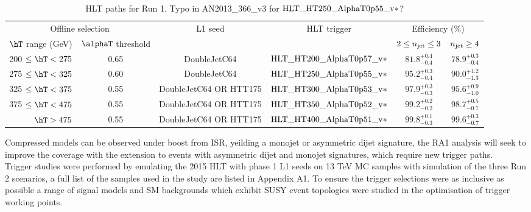 \begin{table}[h!]
\tiny
\centering
\begin{tabular}{|rc||c|c||cc|} 
\hline
\multicolumn{2}{|c||}{Offline selection}         & L1 seed                  & HLT trigger                                               &   \multicolumn{2}{c|}{Efficiency (\%)}            \\[0.7 ex] 
    $\hT$ range (GeV)  & $\alphaT$ threshold &                               &                                                                  &  $2 \le n_{\rm jet} \le 3$ &   $n_{\rm jet} \ge 4$\\[0.7 ex] 
\hline
200 $\le \hT < 275$    & 0.65                         & DoubleJetC64                    &  ${\rm HLT\_HT200\_AlphaT0p57\_v*}$ & $81.8^{+0.4}_{-0.4}$    & $78.9^{+0.3}_{-0.4}$ \\
275 $\le \hT < 325$    & 0.60                         & DoubleJetC64                    &  ${\rm HLT\_HT250\_AlphaT0p55\_v*}$ & $95.2^{+0.3}_{-0.4}$    & $90.0^{+1.2}_{-1.3}$ \\
325 $\le \hT < 375$    & 0.55                         & DoubleJetC64 OR HTT175 &  ${\rm HLT\_HT300\_AlphaT0p53\_v*}$ & $97.9^{+0.3}_{-0.3}$    & $95.6^{+0.9}_{-1.0}$ \\
375 $\le \hT < 475$    & 0.55                         & DoubleJetC64 OR HTT175 &  ${\rm HLT\_HT350\_AlphaT0p52\_v*}$ & $99.2^{+0.2}_{-0.2}$    & $98.7^{+0.5}_{-0.7}$ \\
       $     \hT > 475$    & 0.55                         & DoubleJetC64 OR HTT175 &  ${\rm HLT\_HT400\_AlphaT0p51\_v*}$ & $99.8^{+0.1}_{-0.3}$    & $99.6^{+0.3}_{-0.7}$ \\
\hline


\end{tabular}
\caption{HLT paths for Run 1. {\color{red} Typo in AN2013\_366\_v3 for ${\rm HLT\_HT250\_AlphaT0p55\_v*}$? }  }
\end{table}




Compressed models can be observed under boost from ISR, yeilding a monojet or asymmetric dijet signature, the RA1 analysis will seek to improve the coverage with the extension to events with asymmetric dijet and monojet signatures, which require new trigger paths.\\

Trigger studies were performed by emulating the 2015 HLT with phase 1 L1 seeds on 13 TeV MC samples with simulation of the three Run 2 scenarios, a full list of the samples used in the study are listed in Appendix {\color{blue} A1}. To ensure the trigger selections were as inclusive as possible a range of signal models and SM backgrounds which exhibit SUSY event topologies were studied in the optimisation of trigger working points.\\

